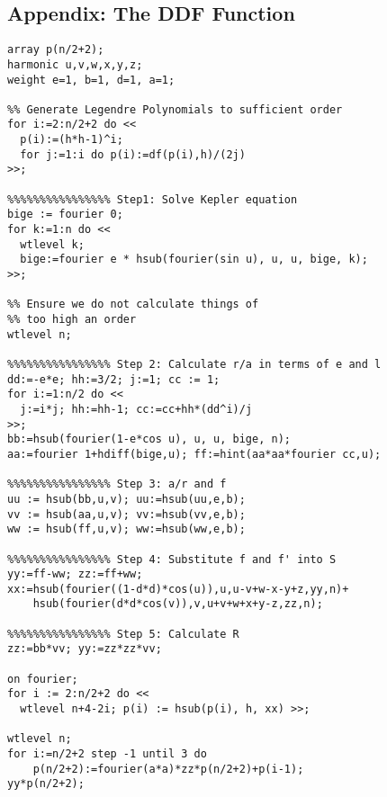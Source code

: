 \subsection*{Appendix: The DDF Function}
\begin{verbatim}
array p(n/2+2);
harmonic u,v,w,x,y,z;
weight e=1, b=1, d=1, a=1;

%% Generate Legendre Polynomials to sufficient order
for i:=2:n/2+2 do <<
  p(i):=(h*h-1)^i;
  for j:=1:i do p(i):=df(p(i),h)/(2j)
>>;

%%%%%%%%%%%%%%%% Step1: Solve Kepler equation
bige := fourier 0;
for k:=1:n do <<
  wtlevel k;
  bige:=fourier e * hsub(fourier(sin u), u, u, bige, k);
>>;

%% Ensure we do not calculate things of
%% too high an order
wtlevel n;

%%%%%%%%%%%%%%%% Step 2: Calculate r/a in terms of e and l
dd:=-e*e; hh:=3/2; j:=1; cc := 1;
for i:=1:n/2 do <<
  j:=i*j; hh:=hh-1; cc:=cc+hh*(dd^i)/j
>>;
bb:=hsub(fourier(1-e*cos u), u, u, bige, n);
aa:=fourier 1+hdiff(bige,u); ff:=hint(aa*aa*fourier cc,u);

%%%%%%%%%%%%%%%% Step 3: a/r and f
uu := hsub(bb,u,v); uu:=hsub(uu,e,b);
vv := hsub(aa,u,v); vv:=hsub(vv,e,b);
ww := hsub(ff,u,v); ww:=hsub(ww,e,b);

%%%%%%%%%%%%%%%% Step 4: Substitute f and f' into S
yy:=ff-ww; zz:=ff+ww;
xx:=hsub(fourier((1-d*d)*cos(u)),u,u-v+w-x-y+z,yy,n)+
    hsub(fourier(d*d*cos(v)),v,u+v+w+x+y-z,zz,n);

%%%%%%%%%%%%%%%% Step 5: Calculate R
zz:=bb*vv; yy:=zz*zz*vv;

on fourier;
for i := 2:n/2+2 do <<
  wtlevel n+4-2i; p(i) := hsub(p(i), h, xx) >>;

wtlevel n;
for i:=n/2+2 step -1 until 3 do
    p(n/2+2):=fourier(a*a)*zz*p(n/2+2)+p(i-1);
yy*p(n/2+2);
\end{verbatim}
